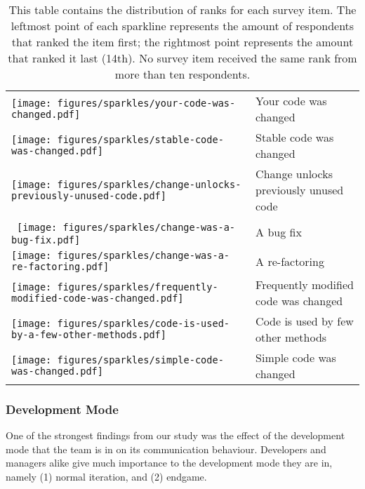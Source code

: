 \begin{table}[t!]
\begin{tabular}{ll}
\vspace{-2pt}\texttt{[image: figures/sparkles/your-code-was-changed.pdf]} & Your code was changed \\
\vspace{-2pt}\texttt{[image: figures/sparkles/stable-code-was-changed.pdf]} & Stable code was changed\\
\vspace{-2pt}\texttt{[image: figures/sparkles/change-unlocks-previously-unused-code.pdf]} & Change unlocks previously unused code\\\
\vspace{-2pt}\texttt{[image: figures/sparkles/change-was-a-bug-fix.pdf]} & A bug fix\\	
\vspace{-2pt}\texttt{[image: figures/sparkles/change-was-a-re-factoring.pdf]} & A re-factoring\\ 
\vspace{-2pt}\texttt{[image: figures/sparkles/frequently-modified-code-was-changed.pdf]} & Frequently modified code was changed \\
\vspace{-2pt}\texttt{[image: figures/sparkles/code-is-used-by-a-few-other-methods.pdf]} & Code is used by few other methods\\ 
\vspace{-2pt}\texttt{[image: figures/sparkles/simple-code-was-changed.pdf]} & Simple code was changed\\
\bottomrule
\end{tabular}
\vspace{-5pt}
\caption{This table contains the distribution of ranks for each survey item. The leftmost point of each sparkline represents the amount of respondents that ranked the item first; the rightmost point represents the amount that ranked it last (14th). No survey item received the same rank from more than ten respondents.}
\label{tab:sparkle}
\end{table}


\subsubsection{Development Mode}
One of the strongest findings from our study was the effect of the development mode that the team is in on its communication behaviour. Developers and managers alike give much importance to the development mode they are in, namely (1) normal iteration, and (2) endgame.

